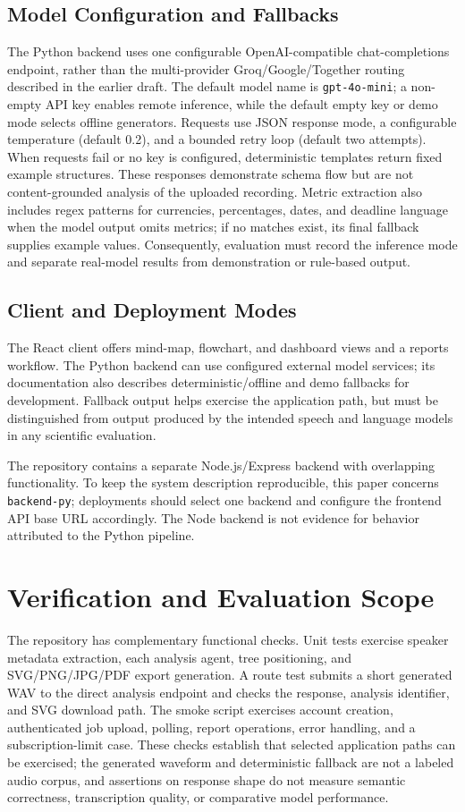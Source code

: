 \documentclass[conference]{IEEEtran}
\begin{document}
\subsection{Model Configuration and Fallbacks}
The Python backend uses one configurable OpenAI-compatible chat-completions endpoint, rather than the multi-provider Groq/Google/Together routing described in the earlier draft. The default model name is \texttt{gpt-4o-mini}; a non-empty API key enables remote inference, while the default empty key or demo mode selects offline generators. Requests use JSON response mode, a configurable temperature (default 0.2), and a bounded retry loop (default two attempts). When requests fail or no key is configured, deterministic templates return fixed example structures. These responses demonstrate schema flow but are not content-grounded analysis of the uploaded recording. Metric extraction also includes regex patterns for currencies, percentages, dates, and deadline language when the model output omits metrics; if no matches exist, its final fallback supplies example values. Consequently, evaluation must record the inference mode and separate real-model results from demonstration or rule-based output.

\subsection{Client and Deployment Modes}
The React client offers mind-map, flowchart, and dashboard views and a reports workflow. The Python backend can use configured external model services; its documentation also describes deterministic/offline and demo fallbacks for development. Fallback output helps exercise the application path, but must be distinguished from output produced by the intended speech and language models in any scientific evaluation.

The repository contains a separate Node.js/Express backend with overlapping functionality. To keep the system description reproducible, this paper concerns \texttt{backend-py}; deployments should select one backend and configure the frontend API base URL accordingly. The Node backend is not evidence for behavior attributed to the Python pipeline.

\section{Verification and Evaluation Scope}
The repository has complementary functional checks. Unit tests exercise speaker metadata extraction, each analysis agent, tree positioning, and SVG/PNG/JPG/PDF export generation. A route test submits a short generated WAV to the direct analysis endpoint and checks the response, analysis identifier, and SVG download path. The smoke script exercises account creation, authenticated job upload, polling, report operations, error handling, and a subscription-limit case. These checks establish that selected application paths can be exercised; the generated waveform and deterministic fallback are not a labeled audio corpus, and assertions on response shape do not measure semantic correctness, transcription quality, or comparative model performance.
\end{document}

